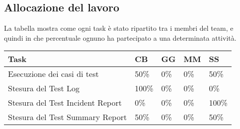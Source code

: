 \subsection{Allocazione del lavoro}
La tabella mostra come ogni task è stato ripartito tra i membri del team, e quindi in che percentuale ognuno ha partecipato a una determinata attività.
\begin{table}[ht]
 \centering
 \begin{tabular}{|p{7.5cm}|p{1cm}|p{1cm}|p{1cm}|p{1cm}|}
  \hline
  \rowcolor{Gray}\textbf{Task}			& \textbf{CB}		& \textbf{GG}		& \textbf{MM}		& \textbf{SS}		\\
  \hline
  Esecuzione dei casi di test			& 50\%			& 0\%			& 0\%			& 50\%			\\
  \hline
  Stesura del Test Log				& 100\%			& 0\%			& 0\%			& 0\%			\\
  \hline
  Stesura del Test Incident Report		& 0\%			& 0\%			& 0\%			& 100\%			\\
  \hline
  Stesura del Test Summary Report		& 50\%			& 0\%			& 0\%			& 50\%			\\
  \hline
 \end{tabular}
\end{table}
